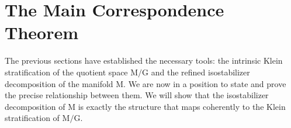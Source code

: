\documentclass[10pt,reqno,letterpaper,twoside]{amsart}
\theoremstyle{article}
\def \G{\mathrm G}
\def \M{\mathrm M}
\begin{document}
  
  \section{The Main Correspondence Theorem}
  \label{sec:Main_Correspondence}
  
  The previous sections have established the necessary tools:
  the intrinsic Klein stratification of the quotient space $\M/\G$ and the refined isostabilizer decomposition of the manifold $\M$.
  We are now in a position to state and prove the precise relationship between them.
  We will show that the isostabilizer decomposition of $\M$ is exactly the structure that maps coherently to the Klein stratification of $\M/\G$.
  
  
\end{document}
